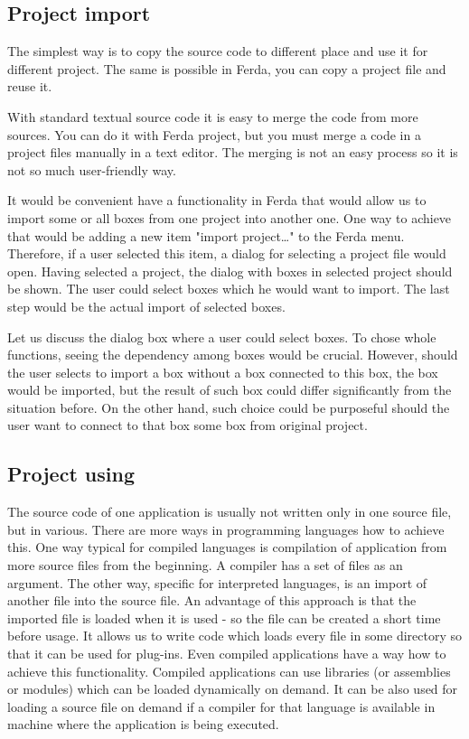 \documentclass[a4paper,12pt]{book}
\begin{document}
\subsection{Project import}
The simplest way is to copy the source code to different place and use it for different project. The same is possible in Ferda, you can copy a project file and reuse it.

With standard textual source code it is easy to merge the code from more sources. You can do it with Ferda project, but you must merge a code in a project files manually in a text editor. The merging is not an easy process so it is not so much user-friendly way.

It would be convenient have a functionality in Ferda that would allow us to import some or all boxes from one project into another one. One way to achieve that would be adding a new item "import project\dots" to the Ferda menu. Therefore, if a user selected this item, a dialog for selecting a project file would open. Having selected a project, the dialog with boxes in selected project should be shown. The user could select boxes which he would want to import. The last step would be the actual import of selected boxes.

Let us discuss the dialog box where a user could select boxes. To chose whole functions, seeing the dependency among boxes would be crucial. However, should the user selects to import a box without a box connected to this box, the box would be imported, but the result of such box could differ significantly from the situation before. On the other hand, such choice could be purposeful should the user want to connect to that box some box from original project.


\subsection{Project using}
The source code of one application is usually not written only in one source file, but in various. There are more ways in programming languages how to achieve this. One way typical for compiled languages is compilation of application from more source files from the beginning. A compiler has a set of files as an argument. The other way, specific for interpreted languages, is an import of another file into the source file. An advantage of this approach is that the imported file is loaded when it is used - so the file can be created a short time before usage. It allows us to write code which loads every file in some directory so that it can be used for plug-ins. Even compiled applications have a way how to achieve this functionality. Compiled applications can use libraries (or assemblies or modules) which can be loaded dynamically on demand. It can be also used for loading a source file on demand if a compiler for that language is available in machine where the application is being executed.
\end{document}
